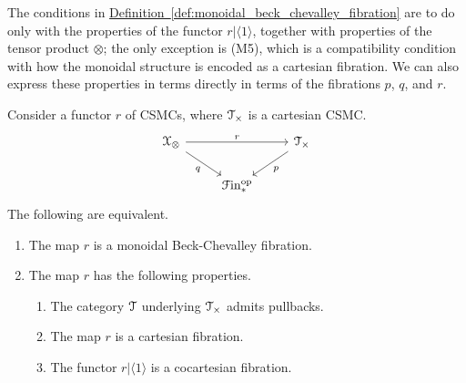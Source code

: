 \documentclass[main.tex]{subfiles}
\begin{document}
The conditions in \hyperref[def:monoidal_beck_chevalley_fibration]{Definition~\ref*{def:monoidal_beck_chevalley_fibration}} are to do only with the properties of the functor $r|\langle 1 \rangle$, together with properties of the tensor product $\otimes$; the only exception is (M5), which is a compatibility condition with how the monoidal structure is encoded as a cartesian fibration. We can also express these properties in terms directly in terms of the fibrations $p$, $q$, and $r$.
\begin{lemma}
  \label{lemma:equivalent_conditions_beck_chevalley_fibration}
  Consider a functor $r$ of CSMCs, where $\mathcal{T}_{\times}$ is a cartesian CSMC.
  \begin{equation*}
    \begin{tikzcd}
      \category{X}_{\otimes}
      \arrow[rr, "r"]
      \arrow[dr, swap, "q"]
      && \category{T}_{\times}
      \arrow[dl, "p"]
      \\
      & \Finp\op
    \end{tikzcd}
  \end{equation*}
  The following are equivalent.
  \begin{enumerate}
    \item The map $r$ is a monoidal Beck-Chevalley fibration.

    \item The map $r$ has the following properties.
      \begin{enumerate}
        \item The category $\mathcal{T}$ underlying $\mathcal{T}_{\times}$ admits pullbacks.

        \item The map $r$ is a cartesian fibration.

        \item The functor $r|\langle 1 \rangle$ is a cocartesian fibration.


\end{enumerate}
\end{enumerate}
\end{lemma}
\end{document}
